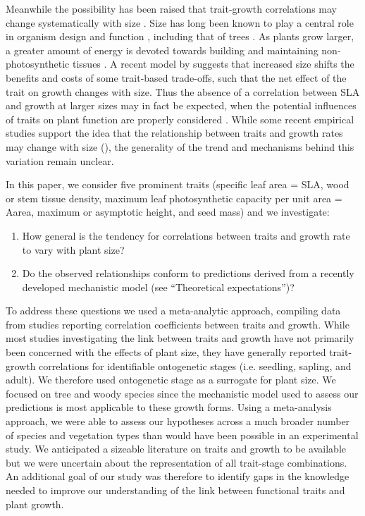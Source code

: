 \documentclass[a4paper,11pt]{article}
\begin{document}
Meanwhile the possibility has been raised that trait-growth correlations may change systematically with size \citep{King-1999, Falster:2011ii, Ruger:2012jv, Iida:2014ep, Iida:2014hq}. Size has long been known to play a central role in organism design and function \citep{Vogel:1988ux, Vogel:2003wb}, including that of trees \citep{Farnsworth:1995im, Givnish:1995ta, King-2011}. As plants grow larger, a greater amount of energy is devoted towards building and maintaining non-photosynthetic tissues \citep{Givnish:1995ta,King-2011}. A recent model by \citet{Falster:2011ii} suggests that increased size shifts the benefits and costs of some trait-based trade-offs, such that the net effect of the trait on growth changes with size. Thus the absence of a correlation between SLA and growth at larger sizes may in fact be expected, when the potential influences of traits on plant function are properly considered \citep{Falster:2011ii}. While some recent empirical studies support the idea that the relationship between traits and growth rates may change with size (\citealt{Iida:2014ep, Iida:2014hq}), the generality of the trend and mechanisms behind this variation remain unclear.

In this paper, we consider five prominent traits (specific leaf area = SLA, wood or stem tissue density, maximum leaf photosynthetic capacity per unit area = Aarea, maximum or asymptotic height, and seed mass) and we investigate:
\begin{enumerate}
  \item How general is the tendency for correlations between traits and growth rate to vary with plant size?
  \item Do the observed relationships conform to predictions derived from a recently developed mechanistic model \citep{Falster:2011ii} (see ``Theoretical expectations'')?
\end{enumerate}
To address these questions we used a meta-analytic approach, compiling data from studies reporting correlation coefficients between traits and growth. While most studies investigating the link between traits and growth have not primarily been concerned with the effects of plant size, they have generally reported trait-growth correlations for identifiable ontogenetic stages (i.e. seedling, sapling, and adult). We therefore used ontogenetic stage as a surrogate for plant size. We focused on tree and woody species since the mechanistic model used to assess our predictions is most applicable to these growth forms.
Using a meta-analysis approach, we were able to assess our hypotheses across a much broader number of species and vegetation types than would have been possible in an experimental study. We anticipated a sizeable literature on traits and growth to be available but we were uncertain about the representation of all trait-stage combinations. An additional goal of our study was therefore to identify gaps in the knowledge needed to improve our understanding of the link between functional traits and plant growth.
\end{document}
